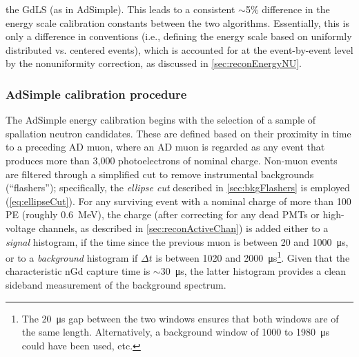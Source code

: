 \documentclass[../thesis.tex]{subfiles}
\begin{document}
the GdLS (as in AdSimple). This leads to a consistent $\sim$5\% difference in the energy scale calibration constants between the two algorithms. Essentially, this is only a difference in conventions (i.e., defining the energy scale based on uniformly distributed vs. centered events), which is accounted for at the event-by-event level by the nonuniformity correction, as discussed in \autoref{sec:reconEnergyNU}.

\begin{comment}
  A sample enriched in such neutrons is obtained by selecting events in a time window (XXX define) immediately after AD muons (XXX of what minimum energy?). These captures are distributed uniformly throughout the GdLS, much like IBDs. The nGd capture peak in the charge distribution is fit to a Gaussian (XXX crystal ball?), and the location of the peak is defined as corresponding to 7.95 MeV (XXX) 8.0 MeV according to doc-7334 (AdSimple). This energy scale is stored in the offline database, valid for the period in which the neutrons were collected. In the near (far) halls, it takes XXX (YYY) days to obtain the necessary statistics; this is thus the time-resolution of the energy scale, which is sufficient, given that the light yield changes very slowly, declining by some 1\% to 1.5\% per year.
  
24 hours
\end{comment}

\begin{comment}
  Figure out exactly what energy is pegged by AdSimple and AdScaled. 7.95 MeV? Discuss differences (e.g. due to muon afterpulsing?)
  5x15min Co60
  4x10hour AmC
\end{comment}

\subsubsection{AdSimple calibration procedure}
\label{sec:reconEnergyAdSimpleCalib}

The AdSimple energy calibration begins with the selection of a sample of spallation neutron candidates. These are defined based on their proximity in time to a preceding AD muon, where an AD muon is regarded as any event that produces more than 3,000 photoelectrons of nominal charge. Non-muon events are filtered through a simplified cut to remove instrumental backgrounds (``flashers''); specifically, the \emph{ellipse cut} described in \autoref{sec:bkgFlashers} is employed (\autoref{eq:ellipseCut}). For any surviving event with a nominal charge of more than 100 PE (roughly 0.6~MeV), the charge (after correcting for any dead PMTs or high-voltage channels, as described in \autoref{sec:reconActiveChan}) is added either to a \emph{signal} histogram, if the time since the previous muon is between 20 and \SI{1000}{\micro s}, or to a \emph{background} histogram if $\Delta t$ is between 1020 and \SI{2000}{\micro s}\footnote{The \SI{20}{\micro s} gap between the two windows ensures that both windows are of the same length. Alternatively, a background window of 1000 to \SI{1980}{\micro s} could have been used, etc.}. Given that the characteristic nGd capture time is $\sim$\SI{30}{\micro s}, the latter histogram provides a clean sideband measurement of the background spectrum.
\end{document}
